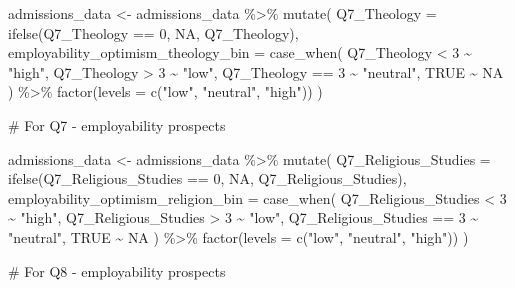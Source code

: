 \documentclass[
  letterpaper,
  DIV=11,
  numbers=noendperiod]{scrartcl}
\newenvironment{Shaded}{\begin{snugshade}}{\end{snugshade}}
\newcommand{\AttributeTok}[1]{\textcolor[rgb]{0.40,0.45,0.13}{#1}}
\newcommand{\CommentTok}[1]{\textcolor[rgb]{0.37,0.37,0.37}{#1}}
\newcommand{\ConstantTok}[1]{\textcolor[rgb]{0.56,0.35,0.01}{#1}}
\newcommand{\DecValTok}[1]{\textcolor[rgb]{0.68,0.00,0.00}{#1}}
\newcommand{\FunctionTok}[1]{\textcolor[rgb]{0.28,0.35,0.67}{#1}}
\newcommand{\NormalTok}[1]{\textcolor[rgb]{0.00,0.23,0.31}{#1}}
\newcommand{\OtherTok}[1]{\textcolor[rgb]{0.00,0.23,0.31}{#1}}
\newcommand{\SpecialCharTok}[1]{\textcolor[rgb]{0.37,0.37,0.37}{#1}}
\newcommand{\StringTok}[1]{\textcolor[rgb]{0.13,0.47,0.30}{#1}}
\begin{document}
\begin{Shaded}
\begin{Highlighting}[]
\NormalTok{admissions\_data }\OtherTok{\textless{}{-}}\NormalTok{ admissions\_data }\SpecialCharTok{\%\textgreater{}\%}
  \FunctionTok{mutate}\NormalTok{(}
    \AttributeTok{Q7\_Theology =} \FunctionTok{ifelse}\NormalTok{(Q7\_Theology }\SpecialCharTok{==} \DecValTok{0}\NormalTok{, }\ConstantTok{NA}\NormalTok{, Q7\_Theology),}
    \AttributeTok{employability\_optimism\_theology\_bin =} \FunctionTok{case\_when}\NormalTok{(}
\NormalTok{      Q7\_Theology }\SpecialCharTok{\textless{}} \DecValTok{3} \SpecialCharTok{\textasciitilde{}} \StringTok{"high"}\NormalTok{,}
\NormalTok{      Q7\_Theology }\SpecialCharTok{\textgreater{}} \DecValTok{3} \SpecialCharTok{\textasciitilde{}} \StringTok{"low"}\NormalTok{,}
\NormalTok{      Q7\_Theology }\SpecialCharTok{==} \DecValTok{3} \SpecialCharTok{\textasciitilde{}} \StringTok{"neutral"}\NormalTok{,}
      \ConstantTok{TRUE} \SpecialCharTok{\textasciitilde{}} \ConstantTok{NA}
\NormalTok{    ) }\SpecialCharTok{\%\textgreater{}\%} \FunctionTok{factor}\NormalTok{(}\AttributeTok{levels =} \FunctionTok{c}\NormalTok{(}\StringTok{"low"}\NormalTok{, }\StringTok{"neutral"}\NormalTok{, }\StringTok{"high"}\NormalTok{))}
\NormalTok{  )}

\CommentTok{\# For Q7 {-} employability prospects}

\NormalTok{admissions\_data }\OtherTok{\textless{}{-}}\NormalTok{ admissions\_data }\SpecialCharTok{\%\textgreater{}\%}
  \FunctionTok{mutate}\NormalTok{(}
    \AttributeTok{Q7\_Religious\_Studies =} \FunctionTok{ifelse}\NormalTok{(Q7\_Religious\_Studies }\SpecialCharTok{==} \DecValTok{0}\NormalTok{, }\ConstantTok{NA}\NormalTok{, Q7\_Religious\_Studies),}
    \AttributeTok{employability\_optimism\_religion\_bin =} \FunctionTok{case\_when}\NormalTok{(}
\NormalTok{      Q7\_Religious\_Studies }\SpecialCharTok{\textless{}} \DecValTok{3} \SpecialCharTok{\textasciitilde{}} \StringTok{"high"}\NormalTok{,}
\NormalTok{      Q7\_Religious\_Studies }\SpecialCharTok{\textgreater{}} \DecValTok{3} \SpecialCharTok{\textasciitilde{}} \StringTok{"low"}\NormalTok{,}
\NormalTok{      Q7\_Religious\_Studies }\SpecialCharTok{==} \DecValTok{3} \SpecialCharTok{\textasciitilde{}} \StringTok{"neutral"}\NormalTok{,}
      \ConstantTok{TRUE} \SpecialCharTok{\textasciitilde{}} \ConstantTok{NA}
\NormalTok{    ) }\SpecialCharTok{\%\textgreater{}\%} \FunctionTok{factor}\NormalTok{(}\AttributeTok{levels =} \FunctionTok{c}\NormalTok{(}\StringTok{"low"}\NormalTok{, }\StringTok{"neutral"}\NormalTok{, }\StringTok{"high"}\NormalTok{))}
\NormalTok{  )}

\CommentTok{\# For Q8 {-} employability prospects}


\end{Highlighting}
\end{Shaded}
\end{document}
